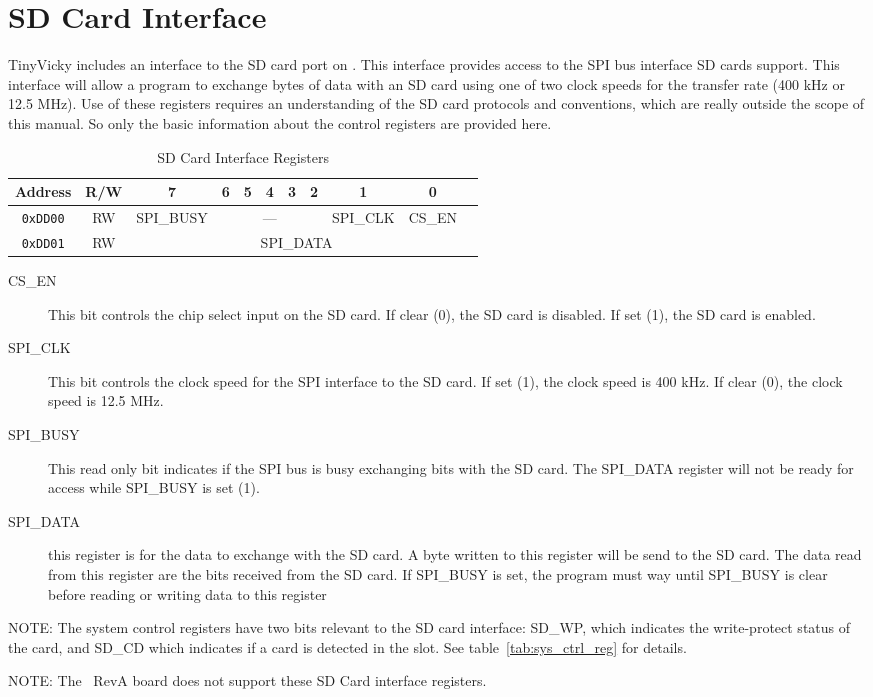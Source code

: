 \chapter{SD Card Interface}

TinyVicky includes an interface to the SD card port on \jr. This interface provides access to the SPI bus interface SD cards support. This interface will allow a program to exchange bytes of data with an SD card using one of two clock speeds for the transfer rate (400 kHz or 12.5 MHz).  Use of these registers requires an understanding of the SD card protocols and conventions, which are really outside the scope of this manual. So only the basic information about the control registers are provided here.

\begin{table}[ht]
    \begin{center}
        \begin{tabular}{|c|c|c|c|c|c|c|c|c|c|c|} \hline
            Address & R/W & 7 & 6 & 5 & 4 & 3 & 2 & 1 & 0 \\\hline\hline
            \verb+0xDD00+ & RW & SPI\_BUSY & \multicolumn{5}{|c|}{---} & SPI\_CLK & CS\_EN \\\hline
            \verb+0xDD01+ & RW & \multicolumn{8}{|c|}{SPI\_DATA} \\\hline
        \end{tabular}
    \end{center}
    \caption{SD Card Interface Registers}
\end{table}

\begin{description}
    \item[CS\_EN] This bit controls the chip select input on the SD card. If clear (0), the SD card is disabled. If set (1), the SD card is enabled.
    \item[SPI\_CLK] This bit controls the clock speed for the SPI interface to the SD card. If set (1), the clock speed is 400 kHz. If clear (0), the clock speed is 12.5 MHz.
    \item[SPI\_BUSY] This read only bit indicates if the SPI bus is busy exchanging bits with the SD card. The SPI\_DATA register will not be ready for access while SPI\_BUSY is set (1).
    \item[SPI\_DATA] this register is for the data to exchange with the SD card. A byte written to this register will be send to the SD card. The data read from this register are the bits received from the SD card. If SPI\_BUSY is set, the program must way until SPI\_BUSY is clear before reading or writing data to this register
\end{description}

NOTE: The system control registers have two bits relevant to the SD card interface: SD\_WP, which indicates the write-protect status of the card, and SD\_CD which indicates if a card is detected in the slot. See table~\ref{tab:sys_ctrl_reg} for details.

\begin{leftbar}
	NOTE: The \jr\ RevA board does not support these SD Card interface registers.
\end{leftbar}